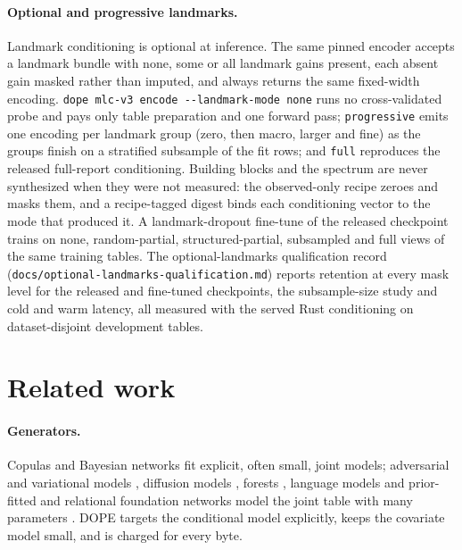 \paragraph{Optional and progressive landmarks.} Landmark conditioning is optional at inference. The
same pinned encoder accepts a landmark bundle with none, some or all landmark gains present, each
absent gain masked rather than imputed, and always returns the same fixed-width encoding.
\texttt{dope mlc-v3 encode -{}-landmark-mode none} runs no cross-validated probe and pays only table
preparation and one forward pass; \texttt{progressive} emits one encoding per landmark group (zero,
then macro, larger and fine) as the groups finish on a stratified subsample of the fit rows; and
\texttt{full} reproduces the released full-report conditioning. Building blocks and the spectrum are
never synthesized when they were not measured: the observed-only recipe zeroes and masks them, and a
recipe-tagged digest binds each conditioning vector to the mode that produced it. A landmark-dropout
fine-tune of the released checkpoint trains on none, random-partial, structured-partial, subsampled
and full views of the same training tables. The optional-landmarks qualification record
(\texttt{docs/\allowbreak optional-\allowbreak landmarks-\allowbreak qualification.md}) reports
retention at every mask level for the released and fine-tuned checkpoints, the subsample-size study
and cold and warm latency, all measured with the served Rust conditioning on dataset-disjoint
development tables.

\section{Related work}
\label{sec:related}

\paragraph{Generators.} Copulas and Bayesian networks \citep{patki2016sdv,chow1968dependence,aas2009paircopula,zhang2014privbayes}
fit explicit, often small, joint models; adversarial and variational models \citep{xu2019ctgan},
diffusion models \citep{kotelnikov2023tabddpm,zhang2024tabsyn,shi2025tabdiff}, forests
\citep{watson2023arf,jolicoeurmartineau2024forestdiffusion}, language models \citep{borisov2023great} and
prior-fitted and relational foundation networks \citep{hollmann2023tabpfn,hollmann2025tabpfn,fey2025kumo}
model the joint table with many parameters \citep{borisov2024survey}. DOPE targets the conditional
model explicitly, keeps the covariate model small, and is charged for every byte.

